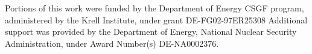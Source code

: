 \documentclass{mc2015}
\begin{document}
Portions of this work were funded by the Department of Energy CSGF program, administered by the Krell Institute, under grant DE-FG02-97ER25308
Additional support was provided by the Department of Energy, National Nuclear Security Administration, under Award Number(s) DE-NA0002376.

\setlength{\baselineskip}{12pt}




%
%
\end{document}
